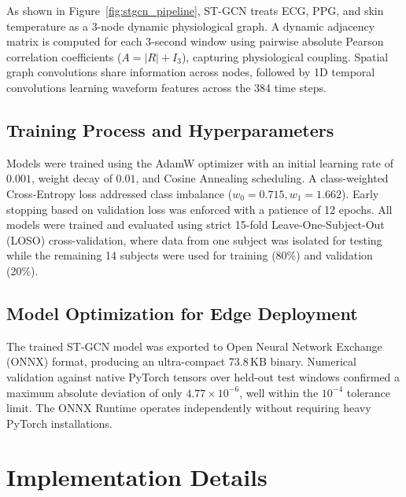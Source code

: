 \documentclass[11pt,a4paper]{article}
\begin{document}
As shown in Figure~\ref{fig:stgcn_pipeline}, ST-GCN treats ECG, PPG, and skin temperature as a 3-node dynamic physiological graph. A dynamic adjacency matrix is computed for each 3-second window using pairwise absolute Pearson correlation coefficients ($A = |R| + I_3$), capturing physiological coupling. Spatial graph convolutions share information across nodes, followed by 1D temporal convolutions learning waveform features across the 384 time steps.

\subsection{Training Process and Hyperparameters}
Models were trained using the AdamW optimizer with an initial learning rate of $0.001$, weight decay of $0.01$, and Cosine Annealing scheduling. A class-weighted Cross-Entropy loss addressed class imbalance ($w_0 = 0.715, w_1 = 1.662$). Early stopping based on validation loss was enforced with a patience of 12 epochs. All models were trained and evaluated using strict 15-fold Leave-One-Subject-Out (LOSO) cross-validation, where data from one subject was isolated for testing while the remaining 14 subjects were used for training (80\%) and validation (20\%).

\subsection{Model Optimization for Edge Deployment}
The trained ST-GCN model was exported to Open Neural Network Exchange (ONNX) format, producing an ultra-compact 73.8\,KB binary. Numerical validation against native PyTorch tensors over held-out test windows confirmed a maximum absolute deviation of only $4.77 \times 10^{-6}$, well within the $10^{-4}$ tolerance limit. The ONNX Runtime operates independently without requiring heavy PyTorch installations.

\section{Implementation Details}
\end{document}
